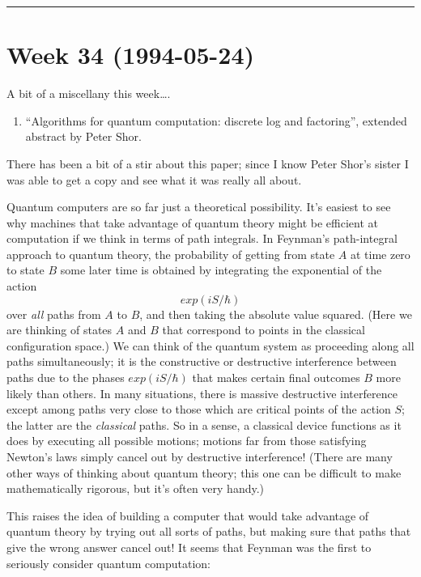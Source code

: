 \documentclass{article}
\def\tightlist{}
\begin{document}
\begin{center}\rule{0.5\linewidth}{0.5pt}\end{center}
\hypertarget{week34}{%
\section{Week 34 (1994-05-24)}\label{week34}}

A bit of a miscellany this week\ldots.

\begin{enumerate}
\def\labelenumi{\arabic{enumi})}
\tightlist
\item
  ``Algorithms for quantum computation: discrete log and factoring'',
  extended abstract by Peter Shor.
\end{enumerate}

There has been a bit of a stir about this paper; since I know Peter
Shor's sister I was able to get a copy and see what it was really all
about.

Quantum computers are so far just a theoretical possibility. It's
easiest to see why machines that take advantage of quantum theory might
be efficient at computation if we think in terms of path integrals. In
Feynman's path-integral approach to quantum theory, the probability of
getting from state \(A\) at time zero to state \(B\) some later time is
obtained by integrating the exponential of the action \[exp(iS/\hbar)\]
over \emph{all} paths from \(A\) to \(B\), and then taking the absolute
value squared. (Here we are thinking of states \(A\) and \(B\) that
correspond to points in the classical configuration space.) We can think
of the quantum system as proceeding along all paths simultaneously; it
is the constructive or destructive interference between paths due to the
phases \(exp(iS/\hbar)\) that makes certain final outcomes \(B\) more
likely than others. In many situations, there is massive destructive
interference except among paths very close to those which are critical
points of the action \(S\); the latter are the \emph{classical} paths.
So in a sense, a classical device functions as it does by executing all
possible motions; motions far from those satisfying Newton's laws simply
cancel out by destructive interference! (There are many other ways of
thinking about quantum theory; this one can be difficult to make
mathematically rigorous, but it's often very handy.)

This raises the idea of building a computer that would take advantage of
quantum theory by trying out all sorts of paths, but making sure that
paths that give the wrong answer cancel out! It seems that Feynman was
the first to seriously consider quantum computation:
\end{document}
